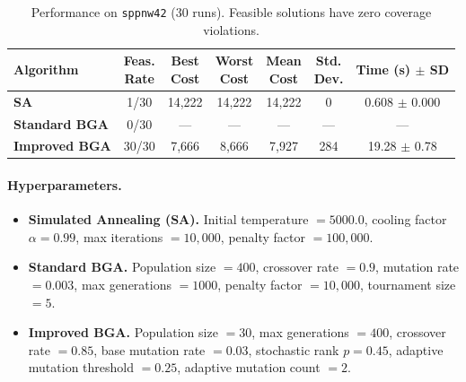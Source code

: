 \documentclass[12pt]{article}
\begin{document}
\begin{table}[htbp]
  \centering
  \label{tab:sppnw42}
  \renewcommand{\arraystretch}{1.1}
  \begin{tabular}{lcccccc}
    \hline
    \textbf{Algorithm} 
      & \makecell{Feas.\\Rate} 
      & \makecell{Best\\Cost} 
      & \makecell{Worst\\Cost} 
      & \makecell{Mean\\Cost} 
      & \makecell{Std.\\Dev.} 
      & \makecell{Time\\(s) $\pm$ SD}\\
    \hline
    \textbf{SA}          
      & 1/30 
      & 14,222
      & 14,222
      & 14,222
      & 0
      & 0.608 $\pm$ 0.000 \\
    \textbf{Standard BGA} 
      & 0/30
      & — 
      & —
      & —
      & —
      & — \\
    \textbf{Improved BGA} 
      & 30/30 
      & 7,666
      & 8,666
      & 7,927
      & 284
      & 19.28 $\pm$ 0.78 \\
    \hline
  \end{tabular}
  \caption{Performance on \texttt{sppnw42} (30 runs). Feasible solutions have zero coverage violations.}
\end{table}

\paragraph{Hyperparameters.}
\vspace{-0.75em}
\begin{itemize}
    \item \textbf{Simulated Annealing (SA).} 
    Initial temperature $= 5000.0$, 
    cooling factor $\alpha = 0.99$, 
    max iterations $= 10{,}000$, 
    penalty factor $= 100{,}000$. 
    \item \textbf{Standard BGA.}
    Population size $= 400$, 
    crossover rate $= 0.9$, 
    mutation rate $= 0.003$, 
    max generations $= 1000$, 
    penalty factor $= 10{,}000$, 
    tournament size $= 5$. 
    \item \textbf{Improved BGA.}
    Population size $= 30$, 
    max generations $= 400$, 
    crossover rate $= 0.85$, 
    base mutation rate $= 0.03$, 
    stochastic rank $p = 0.45$, 
    adaptive mutation threshold $= 0.25$, 
    adaptive mutation count $= 2$.
\end{itemize}
\end{document}
